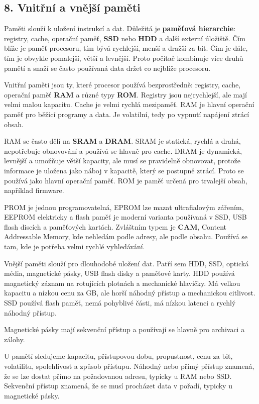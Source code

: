 \documentclass[11pt,a4paper]{article}
\begin{document}
\subsection*{8. Vnitřní a vnější paměti}

Paměti slouží k uložení instrukcí a dat. Důležitá je \textbf{paměťová hierarchie}: registry, cache, operační paměť, \textbf{SSD} nebo \textbf{HDD} a další externí úložiště. Čím blíže je paměť procesoru, tím bývá rychlejší, menší a dražší za bit. Čím je dále, tím je obvykle pomalejší, větší a levnější. Proto počítač kombinuje více druhů pamětí a snaží se často používaná data držet co nejblíže procesoru.

Vnitřní paměti jsou ty, které procesor používá bezprostředně: registry, cache, operační paměť \textbf{RAM} a různé typy \textbf{ROM}. Registry jsou nejrychlejší, ale mají velmi malou kapacitu. Cache je velmi rychlá mezipaměť. RAM je hlavní operační paměť pro běžící programy a data. Je volatilní, tedy po vypnutí napájení ztrácí obsah.

RAM se často dělí na \textbf{SRAM} a \textbf{DRAM}. SRAM je statická, rychlá a drahá, nepotřebuje obnovování a používá se hlavně pro cache. DRAM je dynamická, levnější a umožňuje větší kapacity, ale musí se pravidelně obnovovat, protože informace je uložena jako náboj v kapacitě, který se postupně ztrácí. Proto se používá jako hlavní operační paměť. ROM je paměť určená pro trvalejší obsah, například firmware.

PROM je jednou programovatelná, EPROM lze mazat ultrafialovým zářením, EEPROM elektricky a flash paměť je moderní varianta používaná v SSD, USB flash discích a paměťových kartách. Zvláštním typem je \textbf{CAM}, Content Addressable Memory, kde nehledám podle adresy, ale podle obsahu. Používá se tam, kde je potřeba velmi rychlé vyhledávání.

Vnější paměti slouží pro dlouhodobé uložení dat. Patří sem HDD, SSD, optická média, magnetické pásky, USB flash disky a paměťové karty. HDD používá magnetický záznam na rotujících plotnách a mechanické hlavičky. Má velkou kapacitu a nízkou cenu za GB, ale horší náhodný přístup a mechanickou citlivost. SSD používá flash paměť, nemá pohyblivé části, má nízkou latenci a rychlý náhodný přístup.

Magnetické pásky mají sekvenční přístup a používají se hlavně pro archivaci a zálohy.

U pamětí sledujeme kapacitu, přístupovou dobu, propustnost, cenu za bit, volatilitu, spolehlivost a způsob přístupu. Náhodný nebo přímý přístup znamená, že se lze dostat přímo na požadovanou adresu, typicky u RAM nebo SSD. Sekvenční přístup znamená, že se musí procházet data v pořadí, typicky u magnetické pásky.
\end{document}
